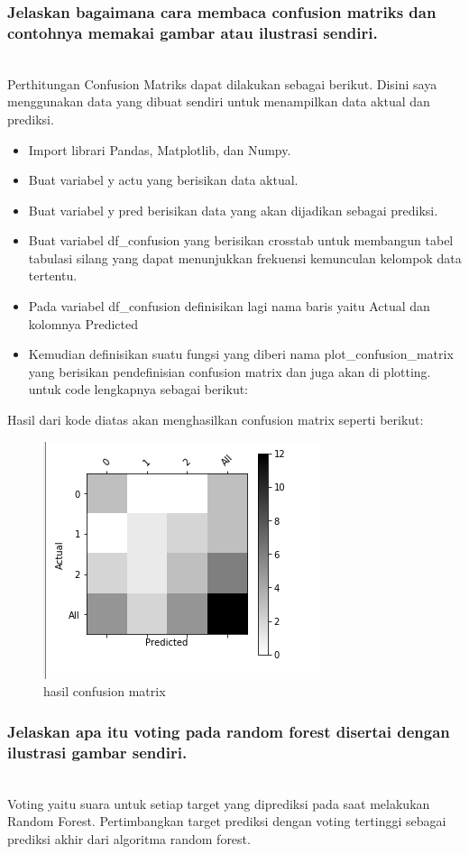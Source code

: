 \subsubsection{Jelaskan bagaimana cara membaca confusion matriks dan contohnya memakai gambar atau ilustrasi sendiri.}
\hfill\\
Perthitungan Confusion Matriks dapat dilakukan sebagai berikut. Disini saya menggunakan data yang dibuat sendiri untuk menampilkan data aktual dan prediksi.
\begin{itemize}
\item Import librari Pandas, Matplotlib, dan Numpy.
\item Buat variabel y actu yang berisikan data aktual.
\item Buat variabel y pred berisikan data yang akan dijadikan sebagai prediksi.
\item Buat variabel df\_confusion yang berisikan crosstab untuk membangun tabel tabulasi silang yang dapat menunjukkan frekuensi kemunculan kelompok data tertentu.
\item Pada variabel df\_confusion deﬁnisikan lagi nama baris yaitu Actual dan kolomnya Predicted
\item Kemudian deﬁnisikan suatu fungsi yang diberi nama plot\_confusion\_matrix yang berisikan pendeﬁnisian confusion matrix dan juga akan di plotting. untuk code lengkapnya sebagai berikut:

\end{itemize}
Hasil dari kode diatas akan menghasilkan confusion matrix seperti berikut:
\begin{figure}[H]
	\centering
	\includegraphics{figures/1174087/3/3.png}
	\caption{hasil confusion matrix}
\end{figure}

\subsubsection{Jelaskan apa itu voting pada random forest disertai dengan ilustrasi gambar sendiri.}
\hfill\\
Voting yaitu suara untuk setiap target yang diprediksi pada saat melakukan Random Forest. Pertimbangkan target prediksi dengan voting tertinggi sebagai prediksi akhir dari algoritma random forest.

